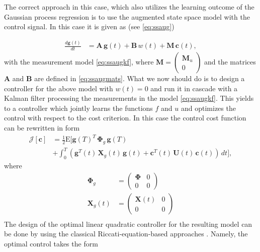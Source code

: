 \documentclass[journal]{IEEEtran}
\begin{document}
The correct approach in this case, which also utilizes the learning outcome of the Gaussian process regression is to use the augmented state space model with the control signal. In this case it is given as (see \eqref{eq:ssaug})

\begin{equation}
\begin{split}
  \frac{d\mathbf{g}(t)}{dt}
  &= \mathbf{A} \, \mathbf{g}(t)
  + \mathbf{B} \, w(t) + \mathbf{M} \, \mathbf{c}(t),
\end{split}
\end{equation}
%
with the measurement model \eqref{eq:ssaugkf}, where $ \mathbf{M} = \begin{pmatrix} \mathbf{M}_u \\ 0 \end{pmatrix}$ and the matrices $\mathbf{A}$ and $\mathbf{B}$ are defined in \eqref{eq:ssaugmats}. What we now should do is to design a controller for the above model with $w(t) = 0$ and run it in cascade with a Kalman filter processing the measurements in the model \eqref{eq:ssaugkf}. This yields to a controller which jointly learns the functions $f$ and $u$ and optimizes the control with respect to the cost criterion. In this case the control cost function can be rewritten in form
%
\begin{equation}
\begin{split}
  \mathcal{J}[\mathbf{c}] &= \frac{1}{2} \mathrm{E} \Big[
    \mathbf{g}(T)^T \, \boldsymbol{\Phi}_g \, \mathbf{g}(T) \\
   &+ \int_0^T
   (\mathbf{g}^T(t) \, \mathbf{X}_g(t) \, \mathbf{g}(t)
  + \mathbf{c}^T(t) \, \mathbf{U}(t) \, \mathbf{c}(t)) \, dt \Big],
\end{split}
\end{equation}
%
where
%
\begin{equation}
\begin{split}
 \boldsymbol{\Phi}_g &= \begin{pmatrix}
   \boldsymbol{\Phi} & 0 \\ 0 & 0
 \end{pmatrix} \\
 \mathbf{X}_g(t) &= \begin{pmatrix}
   \mathbf{X}(t) & 0 \\ 0 & 0
 \end{pmatrix} \\
\end{split}
\end{equation}
%
The design of the optimal linear quadratic controller for the resulting model can be done by using the classical Riccati-equation-based approaches \cite{LQ}. Namely, the optimal control takes the form
\end{document}

